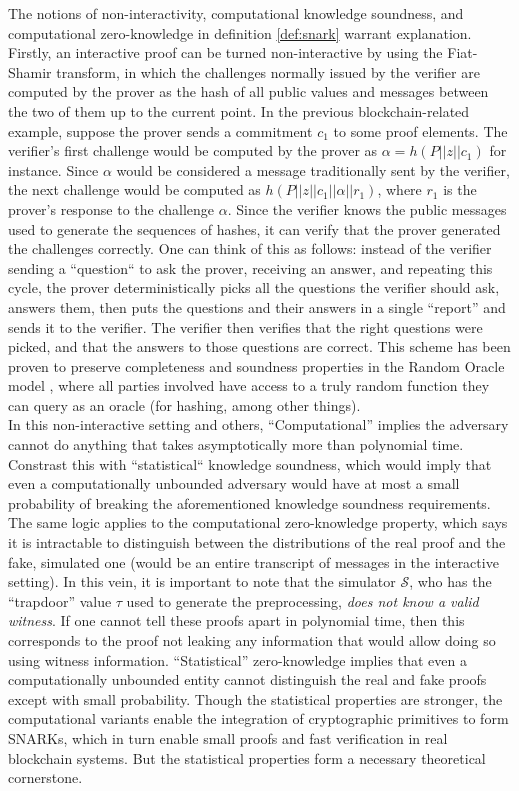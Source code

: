 \noindent The notions of non-interactivity, computational knowledge soundness, and computational zero-knowledge in definition \ref{def:snark} warrant explanation. Firstly, an interactive proof can be turned non-interactive by using the Fiat-Shamir transform, in which the challenges normally issued by the verifier are computed by the prover as the hash of all public values and messages between the two of them up to the current point. In the previous blockchain-related example, suppose the prover sends a commitment $c_1$ to some proof elements. The verifier's first challenge would be computed by the prover as $\alpha = h(P || z || c_1)$ for instance. Since $\alpha$ would be considered a message traditionally sent by the verifier, the next challenge would be computed as $h(P || z || c_1 || \alpha || r_1)$, where $r_1$ is the prover's response to the challenge $\alpha$. Since the verifier knows the public messages used to generate the sequences of hashes, it can verify that the prover generated the challenges correctly. One can think of this as follows: instead of the verifier sending a ``question`` to ask the prover, receiving an answer, and repeating this cycle, the prover deterministically picks all the questions the verifier should ask, answers them, then puts the questions and their answers in a single ``report'' and sends it to the verifier. The verifier then verifies that the right questions were picked, and that the answers to those questions are correct. This scheme has been proven to preserve completeness and soundness properties in the Random Oracle model \cite{rom}, where all parties involved have access to a truly random function they can query as an oracle (for hashing, among other things).\\

\noindent In this non-interactive setting and others, ``Computational'' implies the adversary cannot do anything that takes asymptotically more than polynomial time. Constrast this with ``statistical`` knowledge soundness, which would imply that even a computationally unbounded adversary would have at most a small probability of breaking the aforementioned knowledge soundness requirements. The same logic applies to the computational zero-knowledge property, which says it is intractable to distinguish between the distributions of the real proof and the fake, simulated one (would be an entire transcript of messages in the interactive setting). In this vein, it is important to note that the simulator $\mathcal{S}$, who has the ``trapdoor'' value $\tau$ used to generate the preprocessing, \textit{does not know a valid witness}. If one cannot tell these proofs apart in polynomial time, then this corresponds to the proof not leaking any information that would allow doing so using witness information. ``Statistical'' zero-knowledge implies that even a computationally unbounded entity cannot distinguish the real and fake proofs except with small probability. Though the statistical properties are stronger, the computational variants enable the integration of cryptographic primitives to form SNARKs, which in turn enable small proofs and fast verification in real blockchain systems. But the statistical properties form a necessary theoretical cornerstone.

